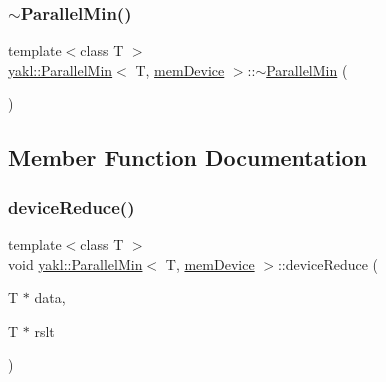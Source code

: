 \mbox{\label{classyakl_1_1ParallelMin_3_01T_00_01memDevice_01_4_a1f4e9f01b1ee74f370219a36d37657d8}} 
\subsubsection{\texorpdfstring{$\sim$\+Parallel\+Min()}{~ParallelMin()}}
{\footnotesize\ttfamily template$<$class T $>$ \\
\hyperlink{classyakl_1_1ParallelMin}{yakl\+::\+Parallel\+Min}$<$ T, \hyperlink{namespaceyakl_ac3c32aec58c61e7f870081477ceee883}{mem\+Device} $>$\+::$\sim$\hyperlink{classyakl_1_1ParallelMin}{Parallel\+Min} (\begin{DoxyParamCaption}{ }\end{DoxyParamCaption})\hspace{0.3cm}{\ttfamily [inline]}}



\subsection{Member Function Documentation}
\mbox{\label{classyakl_1_1ParallelMin_3_01T_00_01memDevice_01_4_a5a27d51468461028e0b88a747c75e782}} 
\subsubsection{\texorpdfstring{device\+Reduce()}{deviceReduce()}}
{\footnotesize\ttfamily template$<$class T $>$ \\
void \hyperlink{classyakl_1_1ParallelMin}{yakl\+::\+Parallel\+Min}$<$ T, \hyperlink{namespaceyakl_ac3c32aec58c61e7f870081477ceee883}{mem\+Device} $>$\+::device\+Reduce (\begin{DoxyParamCaption}\item[{T $\ast$}]{data,  }\item[{T $\ast$}]{rslt }\end{DoxyParamCaption})\hspace{0.3cm}{\ttfamily [inline]}}


